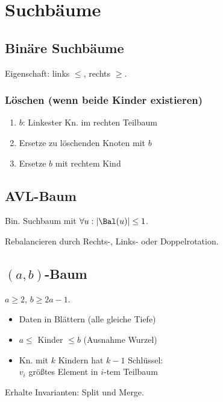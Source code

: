 \section*{Suchbäume}

\subsection*{Binäre Suchbäume}
Eigenschaft: links $\le$, rechts $\ge$.

\subsubsection*{Löschen (wenn beide Kinder existieren)}
\begin{enumerate}
	\item $b$: Linkester Kn. im rechten Teilbaum
	\item Ersetze zu löschenden Knoten mit $b$
	\item Ersetze $b$ mit rechtem Kind
\end{enumerate}

\subsection*{AVL-Baum}
Bin. Suchbaum mit $\forall u: |\Bal(u)| \le 1$.

Rebalancieren durch Rechts-, Links- oder Doppelrotation.

\subsection*{$(a,b)$-Baum}
$a \ge 2$, $b \ge 2a - 1$.
\begin{itemize}
	\item Daten in Blättern (alle gleiche Tiefe)
	\item $a \le$ Kinder $\le b$ (Ausnahme Wurzel)
	\item Kn. mit $k$ Kindern hat $k-1$ Schlüssel:\\
		$v_i$ größtes Element in $i$-tem Teilbaum
\end{itemize}

Erhalte Invarianten: Split und Merge.
